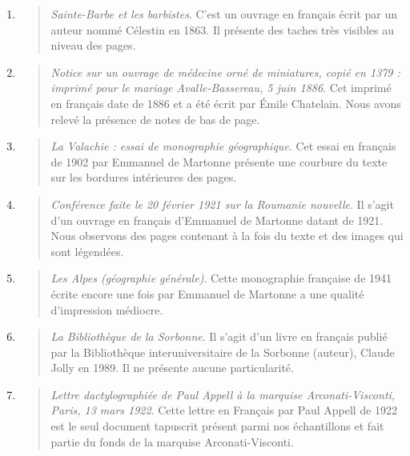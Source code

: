 \documentclass[a4paper,12pt,twoside]{book}
\begin{document}
\begin{enumerate}
\begin{quote}
\end{quote}	
\item
\begin{quote}
	
	\emph{Sainte-Barbe et les barbistes}. 
	C'est un ouvrage en français écrit par un auteur nommé Célestin en 1863. Il présente des taches très visibles au niveau des pages.
	
\end{quote}	
\item
\begin{quote}
	
	\emph{Notice sur un ouvrage de médecine orné de miniatures, copié en 1379 : imprimé pour le mariage Avalle-Bassereau, 5 juin 1886}.
	Cet imprimé en français date de 1886 et a été écrit par Émile Chatelain. Nous avons relevé la présence de notes de bas de page.
	
\end{quote}	
\item
\begin{quote}
	
	\emph{La Valachie : essai de monographie géographique}.
	Cet essai en français de 1902 par Emmanuel de Martonne présente une courbure du texte sur les bordures intérieures des pages.
	
\end{quote}	
\item
\begin{quote}
	
	\emph{Conférence faite le 20 février 1921 sur la Roumanie nouvelle}.
	Il s'agit d'un ouvrage en français d'Emmanuel de Martonne datant de 1921. Nous observons des pages contenant à la fois du texte et des images qui sont légendées.
	
\end{quote}	
\item
\begin{quote}
	
	\emph{Les Alpes (géographie générale)}.	
	Cette monographie française de 1941 	écrite encore une fois par Emmanuel de Martonne a une qualité d'impression médiocre.
	
\end{quote}	
\item
\begin{quote}
	
	\emph{La Bibliothèque de la Sorbonne}.
	Il s'agit d'un livre en français publié par la	Bibliothèque interuniversitaire de la Sorbonne (auteur), Claude Jolly en 1989. Il ne présente aucune particularité.
	
\end{quote}	
\item
\begin{quote}
	
	\emph{Lettre dactylographiée de Paul Appell à la marquise Arconati-Visconti, Paris, 13 mars 1922}.
	Cette lettre en Français par Paul Appell de 1922 est le seul document tapuscrit présent parmi nos échantillons et fait partie du fonds de la marquise Arconati-Visconti. \\
	
\end{quote}		
\end{enumerate}
	
\end{document}
